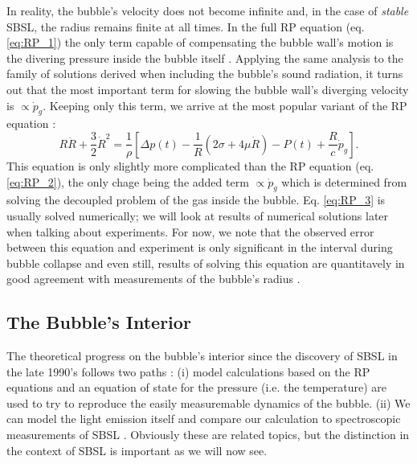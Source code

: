 \documentclass[rmp,aps,nofootinbib,superscriptaddress,floatfix,10pt]{revtex4-2}
\begin{document}
In reality, the bubble's velocity does not become infinite and, in the case of \emph{stable} SBSL, the radius remains finite at all times. In the full RP equation (eq. \ref{eq:RP_1}) the only term capable of compensating the bubble wall's motion is the divering pressure inside the bubble itself \cite{brenner2002single}. Applying the same analysis to the family of solutions derived when including the bubble's sound radiation, it turns out that the most important term for slowing the bubble wall's diverging velocity is $\propto\dot{p}_g$. Keeping only this term, we arrive at the most popular variant of the RP equation \cite{lofstedt1995sonoluminescing,barber1997defining}:
\begin{equation}
    R\ddot{R}+\frac{3}{2}\dot{R}^2 = \frac{1}{\rho} \left[ \Delta p(t)-\frac{1}{R}\left( 2\sigma+4\mu \dot{R} \right)-P(t) +\frac{R}{c} \dot{p}_g \right].
    \label{eq:RP_3}
\end{equation}
This equation is only slightly more complicated than the RP equation (eq. \ref{eq:RP_2}), the only chage being the added term $\propto \dot{p}_g$ which is determined from solving the decoupled problem of the gas inside the bubble. Eq. \ref{eq:RP_3} is usually solved numerically; we will look at results of numerical solutions later when talking about experiments. For now, we note that the observed error between this equation and experiment is only significant in the interval during bubble collapse and even still, results of solving this equation are quantitavely in good agreement with measurements of the bubble's radius \cite{brenner2002single}. 


\subsection{The Bubble's Interior}

The theoretical progress on the bubble's interior since the discovery of SBSL in the late 1990's \cite{gaitan1992sonoluminescence} follows two paths \cite{brenner2002single,suslick2008inside,yasui2018acoustic}: (i) model calculations based on the RP equations and an equation of state for the pressure (i.e. the temperature) are used to try to reproduce the easily measuremable dynamics of the bubble. (ii) We can model the light emission itself and compare our calculation to spectroscopic measurements of SBSL \cite{}. Obviously these are related topics, but the distinction in the context of SBSL is important as we will now see.
\end{document}
